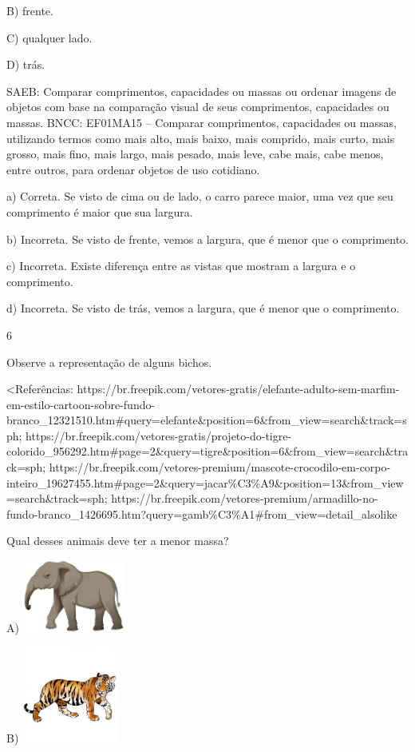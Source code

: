 \begin{itemize}
\begin{itemize}
B) frente.

C) qualquer lado.

D) trás.

SAEB: Comparar comprimentos, capacidades ou massas ou ordenar
imagens de objetos com base na comparação visual de seus comprimentos,
capacidades ou massas.
BNCC: EF01MA15 -- Comparar comprimentos, capacidades ou massas,
utilizando termos como mais alto, mais baixo, mais comprido, mais curto,
mais grosso, mais fino, mais largo, mais pesado, mais leve, cabe mais,
cabe menos, entre outros, para ordenar objetos de uso cotidiano.

a) Correta. Se visto de cima ou de lado, o carro parece maior, uma vez
que seu comprimento é maior que sua largura.

b) Incorreta. Se visto de frente, vemos a largura, que é menor que o
comprimento.

c) Incorreta. Existe diferença entre as vistas que mostram a largura e o
comprimento.

d) Incorreta. Se visto de trás, vemos a largura, que é menor que o
comprimento.

\num{6}

Observe a representação de alguns bichos.

\textless{}Referências:
https://br.freepik.com/vetores-gratis/elefante-adulto-sem-marfim-em-estilo-cartoon-sobre-fundo-branco\_12321510.htm\#query=elefante\&position=6\&from\_view=search\&track=sph;
https://br.freepik.com/vetores-gratis/projeto-do-tigre-colorido\_956292.htm\#page=2\&query=tigre\&position=6\&from\_view=search\&track=sph;
https://br.freepik.com/vetores-premium/mascote-crocodilo-em-corpo-inteiro\_19627455.htm\#page=2\&query=jacar\%C3\%A9\&position=13\&from\_view=search\&track=sph;
https://br.freepik.com/vetores-premium/armadillo-no-fundo-branco\_1426695.htm?query=gamb\%C3\%A1\#from\_view=detail\_alsolike

Qual desses animais deve ter a menor massa?

A)
\includegraphics[width=1.32371in,height=0.93254in]{media/image147.jpg}

B)
\includegraphics[width=1.25000in,height=1.25000in]{media/image148.jpg}


\end{itemize}
\end{itemize}
